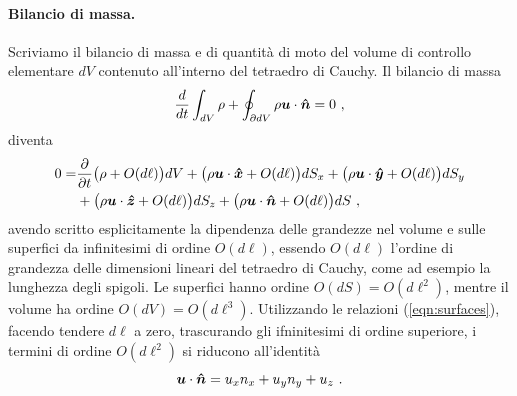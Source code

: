 \paragraph{Bilancio di massa.}
Scriviamo il bilancio di massa e di quantità di moto del volume di controllo elementare $dV$ contenuto all'interno del tetraedro di Cauchy. Il bilancio di massa
\begin{equation}
 \frac{d}{dt} \int_{dV} \rho + \oint_{\partial dV} \rho \bm{u} \cdot \bm{\hat{n}} = 0 \ ,
\end{equation}
diventa
\begin{equation}\label{eqn:dV:mass}
\begin{aligned}
 0 = & \dfrac{\partial{}}{\partial{t}}\big( \rho + O(d\ell) \big) dV
     + \big( \rho \bm{u} \cdot \bm{\hat{x}} + O(d\ell) \big) dS_x
     + \big( \rho \bm{u} \cdot \bm{\hat{y}} + O(d\ell) \big) dS_y \\
   & + \big( \rho \bm{u} \cdot \bm{\hat{z}} + O(d\ell) \big) dS_z
     + \big( \rho \bm{u} \cdot \bm{\hat{n}} + O(d\ell) \big) dS \ ,
\end{aligned}
\end{equation}
avendo scritto esplicitamente la dipendenza delle grandezze nel volume e sulle superfici da infinitesimi di ordine $O(d\ell)$, essendo $O(d\ell)$ l'ordine di grandezza delle dimensioni lineari del tetraedro di Cauchy, come ad esempio la lunghezza degli spigoli. Le superfici hanno ordine $O(dS) = O(d\ell^2)$, mentre il volume ha ordine $O(dV) = O(d\ell^3)$. Utilizzando le relazioni (\ref{eqn:surfaces}), facendo tendere $d\ell$ a zero, trascurando gli ifninitesimi di ordine superiore, i termini di ordine $O(d\ell^2)$ si riducono all'identità
\begin{equation}
 \bm{u} \cdot \bm{\hat{n}} = u_x n_x + u_y n_y + u_z \ .
\end{equation}


